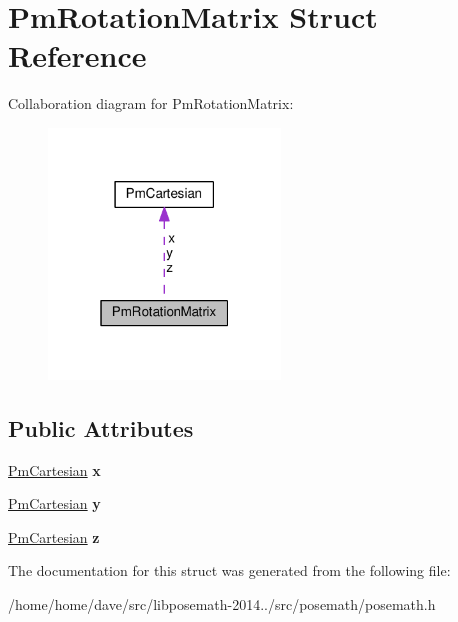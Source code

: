 \hypertarget{structPmRotationMatrix}{}\section{Pm\+Rotation\+Matrix Struct Reference}
\label{structPmRotationMatrix}


Collaboration diagram for Pm\+Rotation\+Matrix\+:
\nopagebreak
\begin{figure}[H]
\begin{center}
\leavevmode
\includegraphics[width=175pt]{structPmRotationMatrix__coll__graph}
\end{center}
\end{figure}
\subsection*{Public Attributes}
\begin{DoxyCompactItemize}
\item 
\hypertarget{structPmRotationMatrix_a2e78c81df93428e13cc0dbf7dcecb16a}{}\hyperlink{structPmCartesian}{Pm\+Cartesian} {\bfseries x}\label{structPmRotationMatrix_a2e78c81df93428e13cc0dbf7dcecb16a}

\item 
\hypertarget{structPmRotationMatrix_a3c31afa8fde83fca9611047239689de3}{}\hyperlink{structPmCartesian}{Pm\+Cartesian} {\bfseries y}\label{structPmRotationMatrix_a3c31afa8fde83fca9611047239689de3}

\item 
\hypertarget{structPmRotationMatrix_a6489b0699ca4582f7f6da5850fe6271d}{}\hyperlink{structPmCartesian}{Pm\+Cartesian} {\bfseries z}\label{structPmRotationMatrix_a6489b0699ca4582f7f6da5850fe6271d}

\end{DoxyCompactItemize}


The documentation for this struct was generated from the following file\+:\begin{DoxyCompactItemize}
\item 
/home/home/dave/src/libposemath-\/2014../src/posemath/posemath.\+h\end{DoxyCompactItemize}
